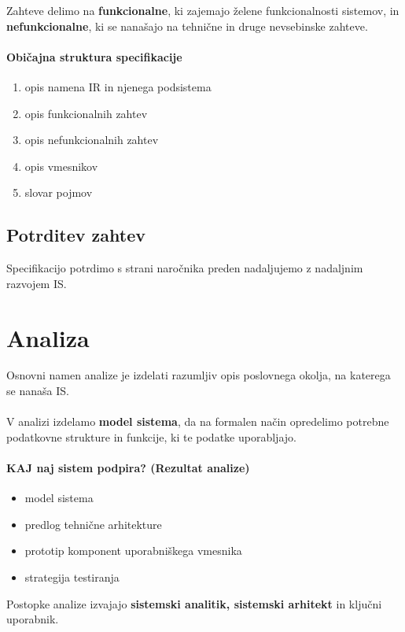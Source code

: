 \documentclass[a4paper,12pt]{report}
\begin{document}
   Zahteve delimo na \textbf{funkcionalne}, ki zajemajo želene funkcionalnosti sistemov, in 
   \textbf{nefunkcionalne}, ki se nanašajo na tehnične in druge nevsebinske zahteve.

   \paragraph{Običajna struktura specifikacije}
   \begin{enumerate}
      \item opis namena IR in njenega podsistema
      \item opis funkcionalnih zahtev
      \item opis nefunkcionalnih zahtev
      \item opis vmesnikov
      \item slovar pojmov
   \end{enumerate}

   \subsection{Potrditev zahtev}
   Specifikacijo potrdimo s strani naročnika preden nadaljujemo z nadaljnim razvojem IS.


   \section{Analiza}
   Osnovni namen analize je izdelati razumljiv opis poslovnega okolja, na katerega se nanaša IS.
   \\\\
   V analizi izdelamo \textbf{model sistema}, da na formalen način opredelimo potrebne podatkovne strukture in funkcije, ki
   te podatke uporabljajo.
   
   \paragraph{KAJ naj sistem podpira? (Rezultat analize)}
   \begin{itemize}
      \item model sistema
      \item predlog tehnične arhitekture
      \item prototip komponent uporabniškega vmesnika
      \item strategija testiranja
   \end{itemize}
   Postopke analize izvajajo \textbf{sistemski analitik, sistemski arhitekt} in ključni uporabnik.
\end{document}
